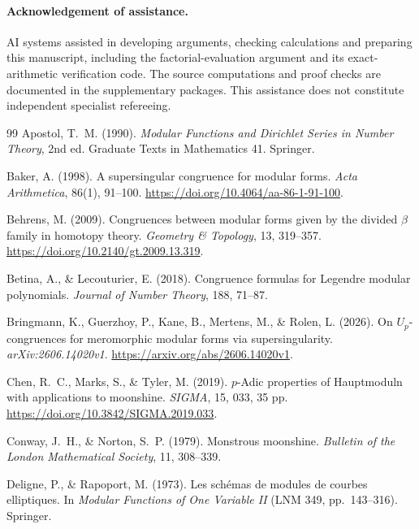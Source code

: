 \documentclass[11pt,a4paper]{article}
\numberwithin{equation}{section}
\theoremstyle{definition}
\theoremstyle{remark}
\begin{document}
\paragraph{Acknowledgement of assistance.}
AI systems assisted in developing arguments, checking calculations and
preparing this manuscript, including the factorial-evaluation argument
and its exact-arithmetic verification code. The source computations
and proof checks are documented in the supplementary packages.
This assistance does not constitute independent specialist refereeing.

\begin{thebibliography}{99}\small
{} Apostol, T.~M. (1990). \emph{Modular Functions and Dirichlet Series in Number Theory}, 2nd ed. Graduate Texts in Mathematics 41. Springer.

 Baker, A. (1998). A supersingular congruence for modular forms.
\emph{Acta Arithmetica}, 86(1), 91--100. \url{https://doi.org/10.4064/aa-86-1-91-100}.

 Behrens, M. (2009). Congruences between modular forms given by the divided $\beta$ family in homotopy theory. \emph{Geometry \& Topology}, 13, 319--357. \url{https://doi.org/10.2140/gt.2009.13.319}.

 Betina, A., \& Lecouturier, E. (2018). Congruence formulas for
Legendre modular polynomials. \emph{Journal of Number Theory}, 188, 71--87.

 Bringmann, K., Guerzhoy, P.,
Kane, B., Mertens, M., \& Rolen, L. (2026). On $U_p$-congruences for
meromorphic modular forms via supersingularity. \emph{arXiv:2606.14020v1}.
\url{https://arxiv.org/abs/2606.14020v1}.

 Chen, R.~C., Marks, S., \& Tyler, M. (2019).
$p$-Adic properties of Hauptmoduln with applications to moonshine.
\emph{SIGMA}, 15, 033, 35 pp. \url{https://doi.org/10.3842/SIGMA.2019.033}.


 Conway, J.~H., \& Norton, S.~P. (1979). Monstrous moonshine.
\emph{Bulletin of the London Mathematical Society}, 11, 308--339.

 Deligne, P., \& Rapoport, M. (1973). Les sch\'emas de modules de
courbes elliptiques. In \emph{Modular Functions of One Variable II} (LNM 349, pp.~143--316). Springer.


\end{thebibliography}
\end{document}
